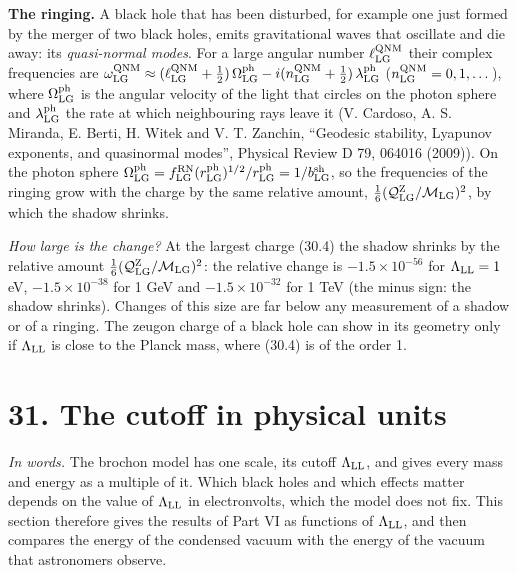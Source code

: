 \documentclass[
  10pt,
]{article}
\begin{document}
\textbf{The ringing.} A black hole that has been disturbed, for example
one just formed by the merger of two black holes, emits gravitational
waves that oscillate and die away: its \emph{quasi-normal modes}. For a
large angular number \(\ell^{\rm QNM}_{\rm LG}\) their complex
frequencies are
\(\omega^{\rm QNM}_{\rm LG}\approx(\ell^{\rm QNM}_{\rm LG}+\tfrac12)\,\Omega^{\rm ph}_{\rm LG}-i(n^{\rm QNM}_{\rm LG}+\tfrac12)\,\lambda^{\rm ph}_{\rm LG}\)
(\(n^{\rm QNM}_{\rm LG}=0,1,\dots\)), where \(\Omega^{\rm ph}_{\rm LG}\)
is the angular velocity of the light that circles on the photon sphere
and \(\lambda^{\rm ph}_{\rm LG}\) the rate at which neighbouring rays
leave it (V. Cardoso, A. S. Miranda, E. Berti, H. Witek and V. T.
Zanchin, ``Geodesic stability, Lyapunov exponents, and quasinormal
modes'', Physical Review D 79, 064016 (2009)). On the photon sphere
\(\Omega^{\rm ph}_{\rm LG}=f^{\rm RN}_{\rm LG}(r^{\rm ph}_{\rm LG})^{1/2}/r^{\rm ph}_{\rm LG}=1/b^{\rm sh}_{\rm LG}\),
so the frequencies of the ringing grow with the charge by the same
relative amount,
\(\tfrac16(\mathcal Q^{\rm Z}_{\rm LG}/\mathcal M_{\rm LG})^2\), by
which the shadow shrinks.

\emph{How large is the change?} At the largest charge (30.4) the shadow
shrinks by the relative amount
\(\tfrac16(\mathcal Q^{\rm Z}_{\rm LG}/\mathcal M_{\rm LG})^2\): the
relative change is \(-1.5\times10^{-56}\) for \(\Lambda_{\rm LL}=1\) eV,
\(-1.5\times10^{-38}\) for 1 GeV and \(-1.5\times10^{-32}\) for 1 TeV
(the minus sign: the shadow shrinks). Changes of this size are far below
any measurement of a shadow or of a ringing. The zeugon charge of a
black hole can show in its geometry only if \(\Lambda_{\rm LL}\) is
close to the Planck mass, where (30.4) is of the order 1.

\hypertarget{the-cutoff-in-physical-units}{%
\section{31. The cutoff in physical
units}\label{the-cutoff-in-physical-units}}

\emph{In words.} The brochon model has one scale, its cutoff
\(\Lambda_{\rm LL}\), and gives every mass and energy as a multiple of
it. Which black holes and which effects matter depends on the value of
\(\Lambda_{\rm LL}\) in electronvolts, which the model does not fix.
This section therefore gives the results of Part VI as functions of
\(\Lambda_{\rm LL}\), and then compares the energy of the condensed
vacuum with the energy of the vacuum that astronomers observe.
\end{document}

